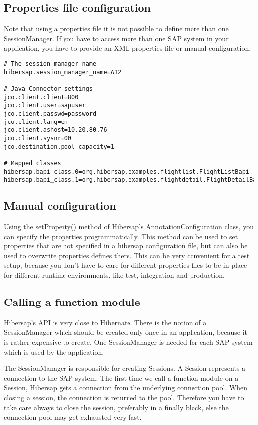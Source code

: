 \subsection{Properties file configuration}

Note that using a properties file it is not possible to define more than one SessionManager. If you have to access more
than one SAP system in your application, you have to provide an XML properties file or manual configuration.

\begin{Verbatim}[frame=single,label=hibersap.properties]
# The session manager name
hibersap.session_manager_name=A12

# Java Connector settings
jco.client.client=800
jco.client.user=sapuser
jco.client.passwd=password
jco.client.lang=en
jco.client.ashost=10.20.80.76
jco.client.sysnr=00
jco.destination.pool_capacity=1

# Mapped classes
hibersap.bapi_class.0=org.hibersap.examples.flightlist.FlightListBapi
hibersap.bapi_class.1=org.hibersap.examples.flightdetail.FlightDetailBapi
\end{Verbatim}


\subsection{Manual configuration}

Using the setProperty() method of Hibersap's AnnotationConfiguration class, you can specify the properties
programmatically. This method can be used to set properties that are not specified in a hibersap configuration file, but
can also be used to overwrite properties defines there. This can be very convenient for a test setup, because you
don't have to care for different properties files to be in place for different runtime environments, like test,
integration and production.



\subsection{Calling a function module}

Hibersap's API is very close to Hibernate.
There is the notion of a SessionManager which should be created only once in an application,
because it is rather expensive to create.
One SessionManager is needed for each SAP system which is used by the application.

The SessionManager is responsible for creating Sessions.
A Session represents a connection to the SAP system. The first time we call a function module
on a Session, Hibersap gets a connection from the underlying connection pool.
When closing a session, the connection is returned to the pool. Therefore you have to take care
always to close the session, preferably in a finally block, else the connection pool may
get exhausted very fast.

